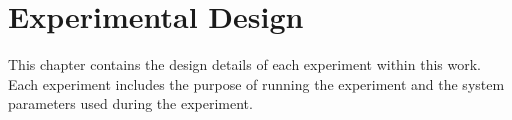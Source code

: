 \chapter{Experimental Design}

This chapter contains the design details of each experiment within this work. Each experiment includes the purpose of running the experiment and the system parameters used during the experiment.





